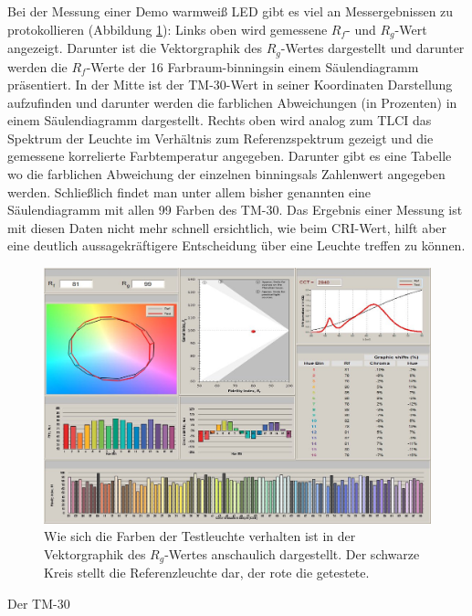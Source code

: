 Bei der Messung einer Demo warmweiß LED gibt es viel an Messergebnissen zu protokollieren (Abbildung \ref{b_tm304}): Links oben wird gemessene $R_{f}$- und $R_{g}$-Wert angezeigt. Darunter ist die Vektorgraphik des $R_{g}$-Wertes dargestellt und darunter werden die $R_{f}$-Werte der 16 Farbraum-\glqq binnings\grqq  in einem Säulendiagramm präsentiert. In der Mitte ist der TM-30-Wert in seiner Koordinaten Darstellung aufzufinden und darunter werden die farblichen Abweichungen (in Prozenten) in einem Säulendiagramm dargestellt. Rechts oben wird analog zum TLCI das Spektrum der Leuchte im Verhältnis zum Referenzspektrum gezeigt und die gemessene korrelierte Farbtemperatur angegeben. Darunter gibt es eine Tabelle wo die farblichen Abweichung der einzelnen \glqq binnings\grqq als Zahlenwert angegeben werden. Schließlich findet man unter allem bisher genannten eine Säulendiagramm mit allen 99 Farben des TM-30. 
Das Ergebnis einer Messung ist mit diesen Daten nicht mehr schnell ersichtlich, wie beim CRI-Wert, hilft aber eine deutlich aussagekräftigere Entscheidung über eine Leuchte treffen zu können. 

\begin{figure}[H]     %
\centering
\includegraphics[width=1.0\textwidth]{bilder/tm304} 
\caption {Wie sich die Farben der Testleuchte verhalten ist in der Vektorgraphik des $R_{g}$-Wertes anschaulich dargestellt. Der schwarze Kreis stellt die Referenzleuchte dar, der rote die getestete.  \protect\footnotemark}\label{b_tm304}
\end{figure}

Der TM-30 



